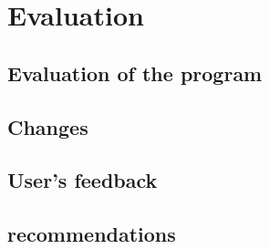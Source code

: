 \chapter{Evaluation}
\section{Evaluation of the program}
\section{Changes}
\section{User's feedback}
\section{recommendations}